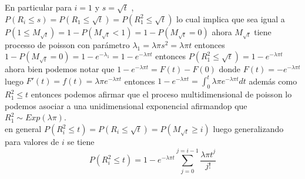\documentclass{article}
\begin{document}
En particular para $i=1$ y $s = \sqrt{t}$ ,\\
$P(R_i\leq s) = P(R_1\leq\sqrt{t}) = P(R^2_1 \leq\sqrt{t})$ lo cual implica que sea igual a $P(1 \leq M_{\sqrt{t}}) = 1-P(M_{\sqrt{t}}<1) = 1-P(M_{\sqrt{t}}=0)$ ahora $M_{\sqrt{t}}$ tiene processo de poisson con  parámetro $\lambda_1 = \lambda\pi s^2 = \lambda\pi t$ entonces $1- P(M_{\sqrt{t}}=0) = 1- e^{-\lambda_1} = 1-e^{-\lambda\pi t} $ entonces $P(R^2_1 \leq\sqrt{t})= 1-e^{-\lambda\pi t}$ ahora bien podemos notar que $ 1-e^{-\lambda\pi t} = F(t)-F(0)$ donde $F(t) = -e^{-\lambda\pi t}$ luego $F'(t) = f(t) = \lambda\pi e^{-\lambda\pi t}$ entonces $1-e^{-\lambda\pi t} = \int_{0}^{t}\lambda\pi e^{-\lambda\pi t}dt$ además como $R^2_1\leq t$ entonces podemos afirmar que el proceso multidimensional de poisson lo podemos asociar a una unidimensional exponencial afirmandop que $R^2_1\sim Exp(\lambda\pi)$. \\
en general $P(R^2_i \leq t) = P(R_i \leq\sqrt{t}) = P(M_{\sqrt{t}}\geq i)$
luego generalizando para valores de $i$ se tiene $$ P(R^2_i \leq t) = 1-e^{-\lambda\pi t}\sum_{j=0}^{j=i-1}\frac{{\lambda\pi t}^j}{j!}$$
\end{document}
